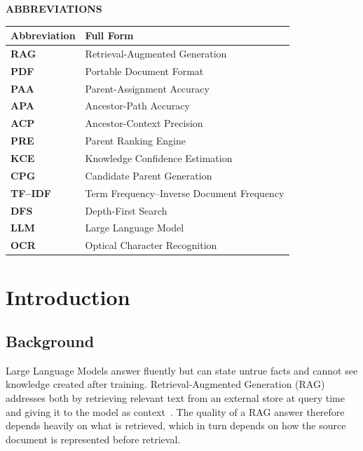\documentclass[12pt,a4paper]{report}
\begin{document}
\tableofcontents\clearpage
{}\listoffigures\clearpage
{}\listoftables\clearpage
{}
\begin{center}{\Large\bfseries ABBREVIATIONS}\end{center}\vspace{6mm}
\noindent\begin{tabularx}{\textwidth}{@{} >{\bfseries}p{3.0cm} X @{}}
\toprule \textbf{Abbreviation} & \textbf{Full Form} \\ \midrule
RAG & Retrieval-Augmented Generation \\
PDF & Portable Document Format \\
PAA & Parent-Assignment Accuracy \\
APA & Ancestor-Path Accuracy \\
ACP & Ancestor-Context Precision \\
PRE & Parent Ranking Engine \\
KCE & Knowledge Confidence Estimation \\
CPG & Candidate Parent Generation \\
TF--IDF & Term Frequency--Inverse Document Frequency \\
DFS & Depth-First Search \\
LLM & Large Language Model \\
OCR & Optical Character Recognition \\ \bottomrule
\end{tabularx}\clearpage

\setcounter{page}{1}
\chapter{Introduction}

\section{Background}
Large Language Models answer fluently but can state untrue facts and cannot see knowledge created
after training. Retrieval-Augmented Generation (RAG) addresses both by retrieving relevant text
from an external store at query time and giving it to the model as
context~\cite{lewis2020rag,guu2020realm}. The quality of a RAG answer therefore depends heavily on
what is retrieved, which in turn depends on how the source document is represented before retrieval.
\end{document}
